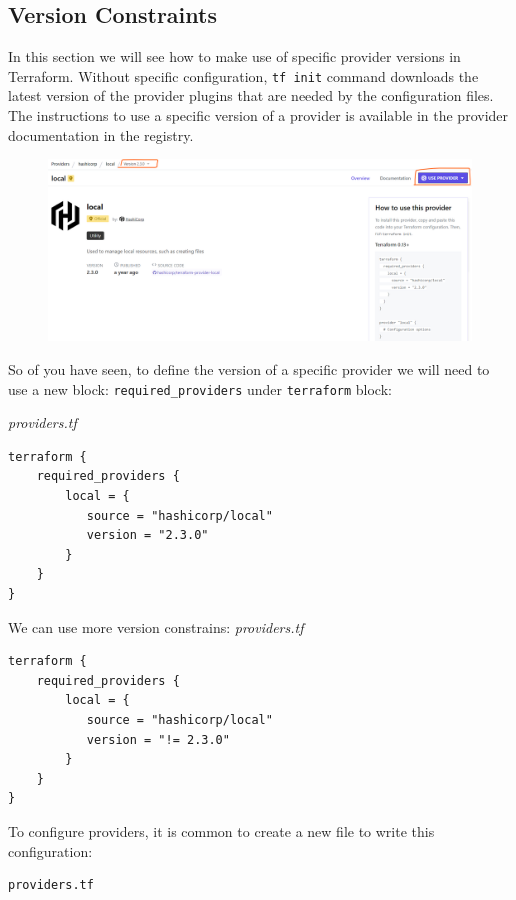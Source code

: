 \documentclass{article}
\newenvironment{blocktemplate}[1]{%
    \tcolorbox[beamer,%
    noparskip,breakable,
    colframe=Blue,%
    colbacklower=LimeGreen!75!LightGreen,%
    title=#1]}%
    {\endtcolorbox}
\newenvironment{codetemplate}[1][]{%
  \mybasecolorbox[#1]
  \itshape
}{%
  \endmybasecolorbox
}
\begin{document}
\subsection{Version Constraints}
In this section we will see how to make use of specific provider versions in Terraform. Without specific configuration, \verb+tf init+ command downloads the latest version of the provider plugins that are needed by the configuration files. The instructions to use a specific version of a provider is available in the provider documentation in the registry.

\begin{figure}[H]
    \includegraphics[width=\textwidth]{pictures/pic12.png}
    \centering
\end{figure}

So of you have seen, to define the version of a specific provider we will need to use a new block: \verb+required_providers+ under \verb+terraform+ block:

\begin{codetemplate}{providers.tf}
\begin{verbatim}
terraform {
    required_providers {
        local = {
           source = "hashicorp/local"
           version = "2.3.0"
        }
    }
}
\end{verbatim}
\end{codetemplate}

We can use more version constrains:
\begin{codetemplate}{providers.tf}
\begin{verbatim}
terraform {
    required_providers {
        local = {
           source = "hashicorp/local"
           version = "!= 2.3.0"
        }
    }
}
\end{verbatim}
\end{codetemplate}

\begin{blocktemplate}{Note}
To configure providers, it is common to create a new file to write this configuration:
\begin{codetemplate}{}
\begin{verbatim}
providers.tf
\end{verbatim}
\end{codetemplate}
\end{blocktemplate}
\end{document}
